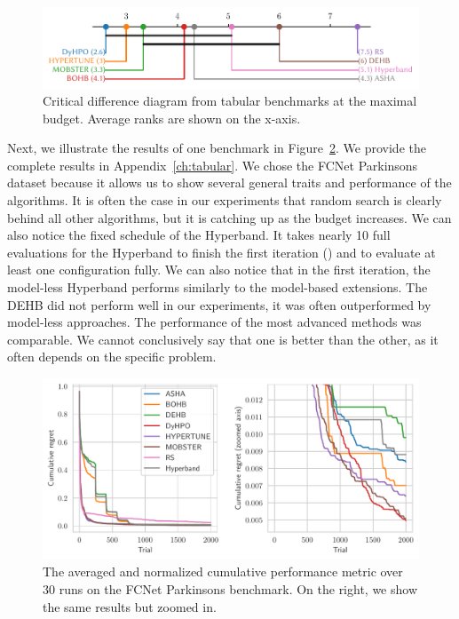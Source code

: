 \begin{figure}[H]
    \centering
    \includegraphics[scale=0.60]{./img/tabular_exp/cd_diagram.pdf}
    \caption{Critical difference diagram from tabular benchmarks at the maximal budget. Average ranks are shown on the x-axis.}
    \label{ci:tabular}
\end{figure}

Next, we illustrate the results of one benchmark in Figure~\ref{fig:parkinsons}. We provide the complete results in Appendix~\ref{ch:tabular}. We chose the FCNet Parkinsons dataset because it allows us to show several general traits and performance of the algorithms. It is often the case in our experiments that random search is clearly behind all other algorithms, but it is catching up as the budget increases. We can also notice the fixed schedule of the Hyperband. It takes nearly 10 full evaluations for the Hyperband to finish the first iteration () and to evaluate at least one configuration fully. We can also notice that in the first iteration, the model-less Hyperband performs similarly to the model-based extensions. The DEHB did not perform well in our experiments, it was often outperformed by model-less approaches. The performance of the most advanced methods was comparable. We cannot conclusively say that one is better than the other, as it often depends on the specific problem.

\begin{figure}[H]
    \centering
    \includegraphics[scale=0.58]{img/tabular_exp/fcnet-parkinsons_plot.pdf}
    \caption{The averaged and normalized cumulative performance metric over 30 runs on the FCNet Parkinsons benchmark. On the right, we show the same results but zoomed in.}
    \label{fig:parkinsons}
\end{figure}


